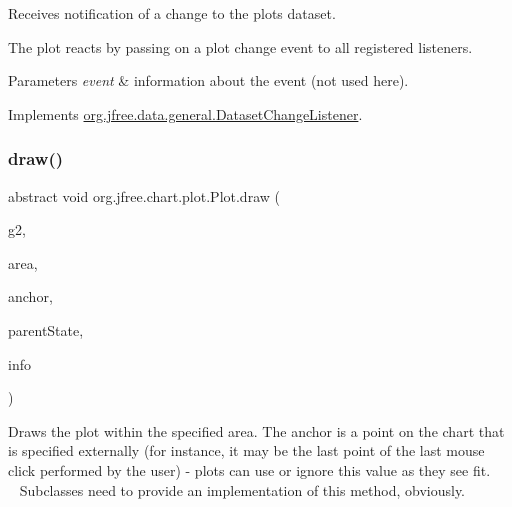 Receives notification of a change to the plot\textquotesingle{}s dataset. 

The plot reacts by passing on a plot change event to all registered listeners.


\begin{DoxyParams}{Parameters}
{\em event} & information about the event (not used here). \\
\hline
\end{DoxyParams}


Implements \mbox{\hyperlink{interfaceorg_1_1jfree_1_1data_1_1general_1_1_dataset_change_listener_a26ca53969f0dfa539f52e846a3cd72fe}{org.\+jfree.\+data.\+general.\+Dataset\+Change\+Listener}}.

\mbox{\label{classorg_1_1jfree_1_1chart_1_1plot_1_1_plot_a2622697ee7fcb983a92860c93177089c}} 
\subsubsection{\texorpdfstring{draw()}{draw()}}
{\footnotesize\ttfamily abstract void org.\+jfree.\+chart.\+plot.\+Plot.\+draw (\begin{DoxyParamCaption}\item[{Graphics2D}]{g2,  }\item[{Rectangle2D}]{area,  }\item[{Point2D}]{anchor,  }\item[{\mbox{\hyperlink{classorg_1_1jfree_1_1chart_1_1plot_1_1_plot_state}{Plot\+State}}}]{parent\+State,  }\item[{\mbox{\hyperlink{classorg_1_1jfree_1_1chart_1_1plot_1_1_plot_rendering_info}{Plot\+Rendering\+Info}}}]{info }\end{DoxyParamCaption})\hspace{0.3cm}{\ttfamily [abstract]}}

Draws the plot within the specified area. The anchor is a point on the chart that is specified externally (for instance, it may be the last point of the last mouse click performed by the user) -\/ plots can use or ignore this value as they see fit. ~\newline
~\newline
 Subclasses need to provide an implementation of this method, obviously.


